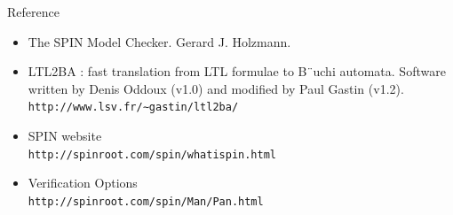 \documentclass[12pt]{beamer}
\newcommand{\code}[1]{\texttt{#1}}
\begin{document}

\begin{frame}{Reference}
\begin{itemize}
	\item The SPIN Model Checker. Gerard J. Holzmann.
	\item LTL2BA : fast translation from LTL formulae to B¨uchi automata. Software written by Denis
Oddoux (v1.0) and modified by Paul Gastin (v1.2).\\
		\code{http://www.lsv.fr/∼gastin/ltl2ba/}
	\item SPIN website\\
		\code{http://spinroot.com/spin/whatispin.html
}
	\item Verification Options\\
		\code{http://spinroot.com/spin/Man/Pan.html
}
\end{itemize}
\end{frame}
\end{document}
